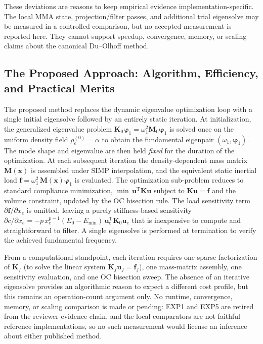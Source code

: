 These deviations are reasons to keep empirical evidence implementation-specific.
The local MMA state, projection/filter passes, and additional trial eigensolve
may be measured in a controlled comparison, but no accepted measurement is
reported here. They cannot support speedup, convergence, memory, or scaling
claims about the canonical Du--Olhoff method.

\subsection*{The Proposed Approach: Algorithm, Efficiency, and Practical Merits}

The proposed method replaces the dynamic eigenvalue optimization loop with a single
initial eigensolve followed by an entirely static iteration.  At initialization, the
generalized eigenvalue problem $\mathbf{K}_0\boldsymbol{\varphi}_1 =
\omega_1^2\mathbf{M}_0\boldsymbol{\varphi}_1$ is solved once on the uniform density
field $\rho_e^{(0)} = \alpha$ to obtain the fundamental eigenpair
$(\omega_1,\boldsymbol{\varphi}_1)$.  The mode shape and eigenvalue are then held
\emph{fixed} for the duration of the optimization.  At each subsequent iteration the
density-dependent mass matrix $\mathbf{M}(\mathbf{x})$ is assembled under SIMP
interpolation, and the equivalent static inertial load $\mathbf{f} =
\omega_1^2\,\mathbf{M}(\mathbf{x})\boldsymbol{\varphi}_1$ is evaluated.  The
optimization sub-problem reduces to standard compliance minimization,
$\min\,\mathbf{u}^\mathrm{T}\mathbf{K}\mathbf{u}$ subject to
$\mathbf{K}\mathbf{u}=\mathbf{f}$ and the volume constraint, updated by the OC
bisection rule.  The load sensitivity term $\partial\mathbf{f}/\partial x_e$ is
omitted, leaving a purely stiffness-based sensitivity
$\partial c/\partial x_e = -p\,x_e^{p-1}(E_0 - E_\mathrm{min})\,\mathbf{u}_e^\mathrm{T}\mathbf{K}_0\mathbf{u}_e$
that is inexpensive to compute and straightforward to filter.  A single eigensolve
is performed at termination to verify the achieved fundamental frequency.

From a computational standpoint, each iteration requires one sparse
factorization of $\mathbf{K}_f$ (to solve the linear system
$\mathbf{K}_f\mathbf{u}_f = \mathbf{f}_f$), one mass-matrix assembly,
one sensitivity evaluation, and one OC bisection sweep. The absence of an
iterative eigensolve provides an algorithmic reason to expect a different cost
profile, but this remains an operation-count argument only. No runtime,
convergence, memory, or scaling comparison is made or pending: EXP1 and EXP5 are
retired from the reviewer evidence chain, and the local comparators are not
faithful reference implementations, so no such measurement would license an
inference about either published method.

